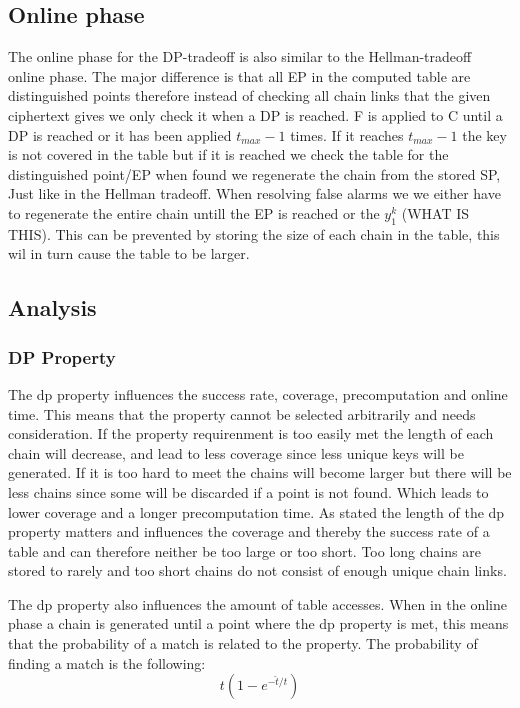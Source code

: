 \subsection{Online phase}
The online phase for the DP-tradeoff is also similar to the Hellman-tradeoff online phase. The major difference is that all EP in the computed table are distinguished points therefore instead of checking all chain links that the given ciphertext gives we only check it when a DP is reached. F is applied to C until a DP is reached or it has been applied $t_{max}-1$ times. If it reaches $t_{max}-1$ the key is not covered in the table but if it is reached we check the table for the distinguished point/EP when found we regenerate the chain from the stored SP, Just like in the Hellman tradeoff. When resolving false alarms we we either have to regenerate the entire chain untill the EP is reached or the $y^k_1$ (WHAT IS THIS). This can be prevented by storing the size of each chain in the table, this wil in turn cause the table to be larger.

\subsection{Analysis}

\subsubsection{DP Property}
The dp property influences the success rate, coverage, precomputation and online time. This means that the property cannot be selected arbitrarily and needs consideration. If the property requirenment is too easily met the length of each chain will decrease, and lead to less coverage since less unique keys will be generated. If it is too hard to meet the chains will become larger but there will be less chains since some will be discarded if a point is not found. Which leads to lower coverage and a longer precomputation time. As stated the length of the dp property matters and influences the coverage and thereby the success rate of a table and can therefore neither be too large or too short. Too long chains are stored to rarely and too short chains do not consist of enough unique chain links.

The dp property also influences the amount of table accesses. When in the online phase a chain is generated until a point where the dp property is met, this means that the probability of a match is related to the property. The probability of finding a match is the following:
\begin{equation}
t(1-e^{-\hat{t}/t})
\end{equation}


